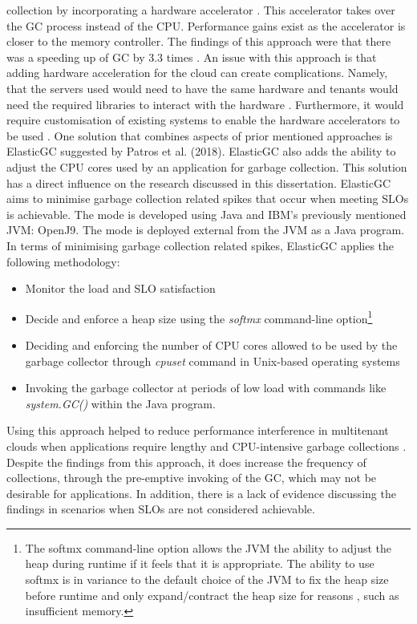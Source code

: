 collection by incorporating a hardware accelerator \cite{maas2018hardware}. This accelerator takes over the GC process instead
of the CPU. Performance gains exist as the accelerator is closer to the
memory controller. The findings of this approach were that there was a
speeding up of GC by 3.3 times \cite{maas2018hardware}. 
\newline\newline 
An issue with this
approach is that adding hardware acceleration for the cloud can create
complications. Namely, that the servers used would need to have the same
hardware and tenants would need the required libraries to interact with
the hardware \cite{chen2014enabling}. Furthermore, it would
require customisation of existing systems to enable the hardware
accelerators to be used \cite{artail}.
\newline\newline
One solution that combines aspects of prior mentioned approaches is
ElasticGC suggested by Patros et al. (2018). ElasticGC also adds the
ability to adjust the CPU cores used by an application for garbage
collection. This solution has a direct influence on the research
discussed in this dissertation. ElasticGC aims to minimise garbage
collection related spikes that occur when meeting SLOs is achievable.
The mode is developed using Java and IBM's previously mentioned JVM:
OpenJ9. The mode is deployed external from the JVM as a Java program. In
terms of minimising garbage collection related spikes, ElasticGC applies
the following methodology:
\begin{itemize}
\item
  Monitor the load and SLO satisfaction
\item
  Decide and enforce a heap size using the \emph{softmx} command-line
  option\footnote{The softmx command-line option allows the JVM the
    ability to adjust the heap during runtime if it feels that it is
    appropriate. The ability to use softmx is in variance to the default
    choice of the JVM to fix the heap size before runtime and only
    expand/contract the heap size for reasons , such as insufficient
    memory.}
\item
  Deciding and enforcing the number of CPU cores allowed to be used by
  the garbage collector through \emph{cpuset} command in Unix-based
  operating systems
\item
  Invoking the garbage collector at periods of low load with commands
  like \emph{system.GC()} within the Java program.
\end{itemize}
Using this approach helped to reduce performance interference in
multitenant clouds when applications require lengthy and
CPU-intensive garbage collections \cite{patros2018resource}.  Despite the
findings from this approach, it does increase the frequency of
collections, through the pre-emptive invoking of the GC, which may not
be desirable for applications. In addition, there is a lack of evidence
discussing the findings in scenarios when SLOs are not considered
achievable.
